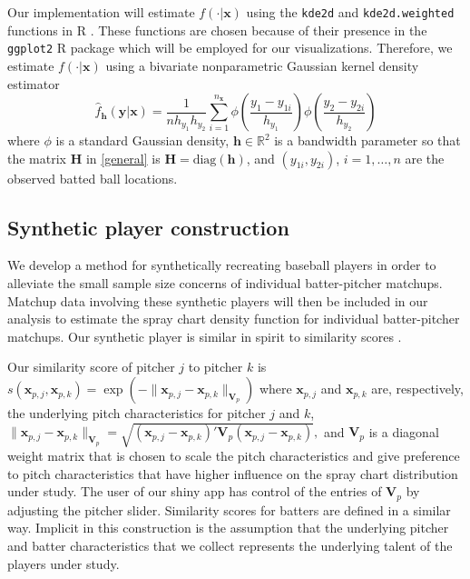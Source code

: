 \documentclass[11pt]{article}
\newcommand{\R}{\mathbb{R}}
\newcommand{\Hbf}{\textbf{H}}
\newcommand{\V}{\textbf{V}}
\newcommand{\y}{\textbf{y}}
\newcommand{\x}{\textbf{x}}
\newcommand{\h}{\textbf{h}}
\begin{document}
Our implementation will estimate $f(\cdot|\x)$ using the \texttt{kde2d} and \texttt{kde2d.weighted} functions in R \citep{MASS, ggtern}. 
These functions are chosen because of their presence 
in the \texttt{ggplot2} R package \citep{ggplot2} which will be employed for our visualizations. Therefore, we estimate $f(\cdot|\x)$ using a bivariate nonparametric Gaussian kernel density estimator
\begin{equation} \label{spraydens}
  \hat f_\h(\y|\x) = 
    \frac{1}{n h_{y_1}h_{y_2}}\sum_{i=1}^{n_\x} \phi\left(\frac{y_1 - y_{1i}}{h_{y_1}}\right)
      \phi\left(\frac{y_2 - y_{2i}}{h_{y_2}}\right)
\end{equation}
where $\phi$ is a standard Gaussian density, $\h \in \R^2$ is a bandwidth parameter so that the matrix $\Hbf$ in \eqref{general} is $\Hbf = \text{diag}(\h)$, and $(y_{1i},y_{2i})$, $i = 1,\ldots,n$ are the observed batted ball locations. 






\subsection{Synthetic player construction}

We develop a method for synthetically recreating baseball players in order to alleviate the small sample size concerns of individual batter-pitcher matchups. Matchup data involving these synthetic players will then be included in our analysis to estimate the spray chart density function for individual batter-pitcher matchups. Our synthetic player is %
similar in spirit to similarity scores \citep{james1994politics, PECOTA}.  

Our similarity score of pitcher $j$ to pitcher $k$ is $s(\x_{p,j}, \x_{p,k}) = \exp(-\|\x_{p,j}-\x_{p,k}\|_{\V_p})$ where $\x_{p,j}$ and $\x_{p,k}$ are, respectively, the underlying pitch characteristics for pitcher $j$ and $k$,
$
 \|\x_{p,j}-\x_{p,k}\|_{\V_p} = \sqrt{(\x_{p,j}-\x_{p,k})'\V_p(\x_{p,j}-\x_{p,k})},
$ 
and $\V_p$ is a diagonal weight matrix that is chosen to scale the pitch characteristics and give preference to pitch characteristics that have higher influence on the spray chart distribution under study. The user of our shiny app has control of the entries of $\V_p$ by adjusting the pitcher slider. Similarity scores for batters are defined in a similar way. Implicit in this construction is the assumption that the underlying pitcher and batter characteristics that we collect represents the underlying talent of the players under study. 
\end{document}
